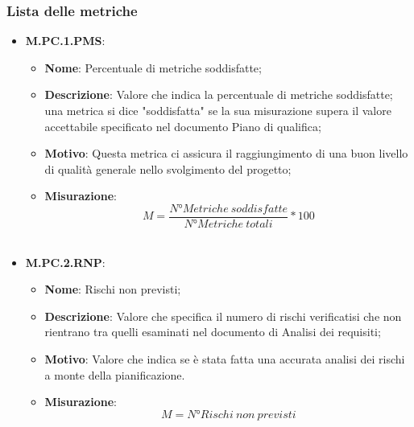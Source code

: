 \documentclass[10pt, a4paper]{article}
\begin{document}


\subsubsection{Lista delle metriche}

\begin{itemize}
    \item \textbf{M.PC.1.PMS}:
    \begin{itemize}
        \item \textbf{Nome}: Percentuale di metriche soddisfatte;
        \item \textbf{Descrizione}: Valore che indica la percentuale di metriche soddisfatte; una metrica si dice "soddisfatta" se la sua misurazione supera il valore accettabile specificato nel documento Piano di qualifica; 
        \item \textbf{Motivo}: Questa metrica ci assicura il raggiungimento di una buon livello di qualità generale nello svolgimento del progetto;
        \item \textbf{Misurazione}: \  \[ M=\frac{N° Metriche \ soddisfatte}{N° Metriche\ totali} * 100 \] \\
    \end{itemize}
  
     \item \textbf{M.PC.2.RNP}:
    \begin{itemize}
        \item \textbf{Nome}: Rischi non previsti;
        \item \textbf{Descrizione}: Valore che specifica il numero di rischi verificatisi che non rientrano tra quelli esaminati nel documento di Analisi dei requisiti;
        \item \textbf{Motivo}: Valore che indica se è stata fatta una accurata analisi dei rischi a monte della pianificazione. 
        \item \textbf{Misurazione}:  \[
        M=N°Rischi \ non \ previsti
        \] \\
    \end{itemize}
 


\end{itemize}
\end{document}

